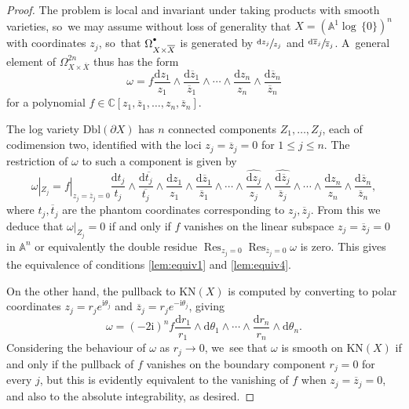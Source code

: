 \documentclass[10pt]{amsart}
\let\oldbullet\bullet
\renewcommand{\bullet}{{\raisebox{1pt}{$\scriptscriptstyle\oldbullet$}}}
\newcommand{\dslog}[1]{\sfrac{\dd#1}{#1}}
\theoremstyle{definition}
\theoremstyle{remark}
\newcommand{\CC}{\mathbb{C}}
\newcommand{\AF}{\mathbb{A}}
\newcommand{\logcyl}{\AF^1 \log\, \{0\}}
\renewcommand{\le}{\leqslant}
\newcommand{\iu}{\mathrm{i}}
\newcommand{\zb}{\overline{z}}
\newcommand{\dd}{\mathrm{d}}
\newcommand{\dlog}[1]{\frac{\dd#1}{#1}}
\DeclareMathOperator*{\res}{Res}
\newcommand{\cX}{\overline{X}}
\newcommand{\KN}[1]{\mathrm{KN}(#1)}
\newcommand{\Dbl}[1]{\mathrm{Dbl}(#1)}
\newcommand{\forms}[2][\bullet]{\Omega^{#1}_{#2}}
\begin{document}
\begin{proof}
The problem is local and invariant under taking products with smooth varieties, so~we may assume without loss of generality that $X = (\logcyl)^n$ with coordinates $z_j$, so~that $\forms{X\times\cX}$ is generated by $\dslog{z_j}$ and $\dslog{\zb_j}$. A~general element of $\forms[2n]{X\times\cX}$ thus has the form
\[
\omega = f \dlog{z_1} \wedge \dlog{\zb_1} \wedge \cdots \wedge \dlog{z_n}\wedge\dlog{\zb_n}
\]
for a polynomial $f \in \CC[z_1,\zb_1,\ldots,z_n,\zb_n]$.

The log variety $\Dbl{\partial X}$ has $n$ connected components $Z_1,\ldots,Z_j$, each of codimension two, identified with the loci $z_j=\zb_j = 0$ for $1 \le j \le n$.
The restriction of $\omega$ to such a component is given by
\[
\omega|_{Z_j} = f|_{z_j=\zb_j=0} \dlog{t_j}\wedge\dlog{\overline{t_j}} \wedge \dlog{z_1}\wedge\dlog{\zb_1} \wedge \cdots \wedge \widehat{\dlog{z_j}}\wedge\widehat{\dlog{\zb_j}} \wedge \cdots\wedge \dlog{z_n}\wedge\dlog{\zb_n},
\]
where $t_j,\overline{t}_j$ are the phantom coordinates corresponding to $z_j,\zb_j$. From this we deduce that $\omega|_{Z_j} = 0$ if and only if $f$ vanishes on the linear subspace $z_j=\zb_j = 0$ in $\AF^n$ or equivalently the double residue $\res_{z_j=0}\res_{\zb_j=0} \omega$ is zero. This gives the equivalence of conditions \eqref{lem:equiv1} and \eqref{lem:equiv4}.

On the other hand, the pullback to $\KN{X}$ is computed by converting to polar coordinates $z_j = r_j e^{\iu \theta_j}$ and $\zb_j = r_j e^{-\iu\theta_j}$, giving
\[
\omega = (-2 \iu)^n f \dlog{r_1}\wedge \dd\theta_1 \wedge \cdots \wedge \dlog{r_n}\wedge \dd\theta_n.
\]
Considering the behaviour of $\omega$ as $r_j \to 0$, we~see that $\omega$ is smooth on $\KN{X}$ if and only if the pullback of $f$ vanishes on the boundary component $r_j=0$ for every $j$, but this is evidently equivalent to the vanishing of $f$ when $z_j=\zb_j = 0$, and also to the absolute integrability, as desired.
\end{proof}
\end{document}
